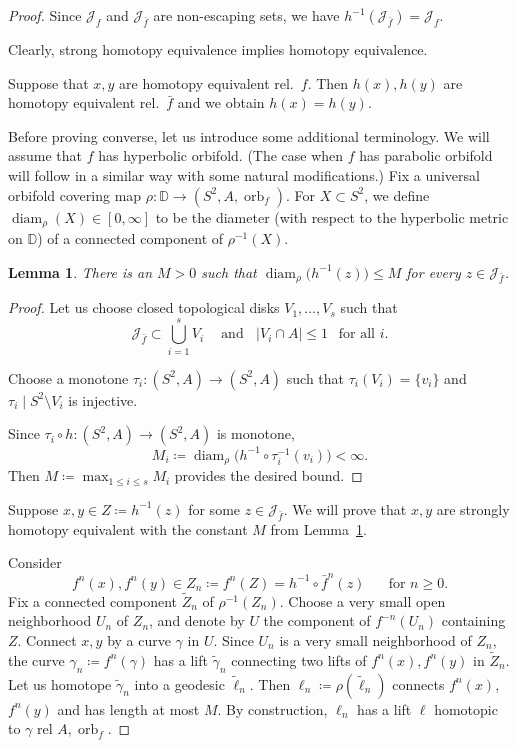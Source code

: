 \documentclass{amsart}
\theoremstyle{plain}
\newtheorem{lemma}[theorem]{Lemma}
\theoremstyle{definition}
\theoremstyle{remark}
\newcommand{\disk}{{\mathbb D}}
\newcommand{\reminder}[1]{\textsl{$\lhd\rhd$#1$\lhd\rhd$}\marginpar{$\lhd\rhd\lhd\rhd\lhd\rhd$}}%
\newcommand{\hide}[1]{}
\renewcommand{\sp}{{\ \ }}
\newcommand{\Jul}{{\mathcal J}}
\newcommand{\orb}{{\operatorname{orb}}}
\newcommand{\diam}{{\operatorname{diam}}}
\begin{document}
\begin{proof}
Since $\Jul_f$ and $\Jul_{\bar f}$ are non-escaping sets, we have $h^{-1}(\Jul_{\bar f})=\Jul_f$.

Clearly, strong homotopy equivalence implies homotopy equivalence.

Suppose that $x,y$ are homotopy equivalent rel.\ $f$. Then $h(x),h(y)$ are homotopy equivalent rel.\ $\bar f$ and we obtain  $h(x)=h(y)$.

Before proving converse, let us introduce some additional terminology. We will assume that $f$ has hyperbolic orbifold. (The case when $f$ has parabolic orbifold will follow in a similar way with some natural modifications.) Fix a universal orbifold covering map $\rho\colon \disk\to (S^2,A,\orb_f)$. For $X\subset S^2$, we define $\diam_\rho (X)\in [0,\infty]$ to be the diameter (with respect to the hyperbolic metric on $\disk$) of a connected component of $\rho^{-1}(X)$. 

\begin{lemma}
\label{lem:const:M}
There is an $M>0$ such that $\diam_\rho\big(h^{-1}(z)\big) \le M$ for every $z\in \Jul_{\bar f}$.  
\end{lemma}
\begin{proof}
Let us choose closed topological disks $V_1,\dots,V_s$ such that \[\Jul_{\bar f}\subset \bigcup _{i=1}^s V_i\sp\sp \text{ and} \sp\sp |V_i\cap A|\le 1\sp \text{ for all }i.\] 

Choose a monotone $\tau_i\colon (S^2,A)\to (S^2,A)$ such that $\tau_i(V_i)=\{v_i\}$ and $\tau_i\mid S^2\setminus V_i$ is injective.

Since $\tau_i\circ h\colon(S^2,A)\to (S^2,A)$ is monotone, \[M_i\coloneq \diam_\rho \big(h^{-1}\circ \tau^{-1}_i(v_i)\big)<\infty .\] Then $M\coloneq\max_{1\le i\le s} M_i$ provides the desired bound.
\end{proof}


Suppose $x,y\in Z\coloneq h^{-1}(z)$ for some $z\in \Jul_{\bar f}$. We will prove that $x,y$ are strongly homotopy equivalent with the constant $M$ from Lemma~\ref{lem:const:M}. 

Consider \[f^n(x),f^n(y)\in  Z_n\coloneq f^n(Z)=h^{-1}\circ \bar f^n(z)\sp\sp\sp \text{ for  }n\ge 0.\]
Fix a connected component $\widetilde Z_n$ of $\rho^{-1}(Z_n)$. Choose a very small open neighborhood $U_n$ of $Z_n$, and denote by $U$ the component of $f^{-n}(U_n)$ containing $Z$. Connect $x,y$ by a curve $\gamma$ in $U$. Since $U_n$ is a very small neighborhood of $Z_n$, the curve $\gamma_n\coloneq f^n(\gamma)$ has a lift $\widetilde \gamma_n$ connecting two lifts of $f^n(x),f^n(y)$ in $\widetilde Z_n$. Let us homotope $\tilde \gamma_n$ into a geodesic $\tilde \ell_n$. Then $\ell_n\coloneq \rho(\tilde \ell_n)$ connects $f^n(x)$, $f^{n}(y)$ and has length at most $M$. By construction, $\ell_n$ has a lift $\ell$ homotopic to $\gamma$ rel $A,\orb_f$. %
\end{proof}
\end{document}
